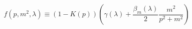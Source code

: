 \begin{equation}
f(p, m^2, \lambda) \equiv (1 - K(p)) \left(\gamma(\lambda) +
\frac{\beta_m (\lambda)}{2} \frac{m^2}{p^2 + m^2} \right)
\end{equation}

